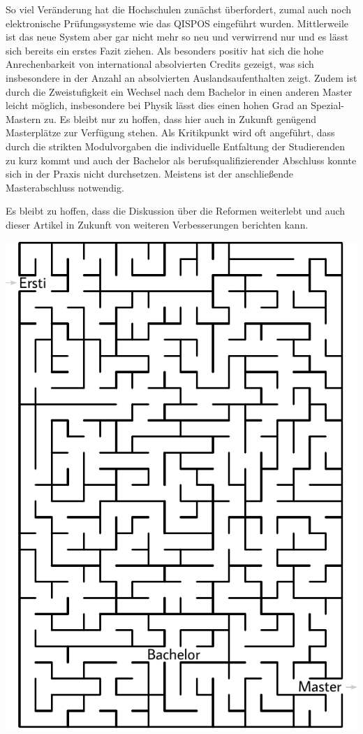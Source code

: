 \begin{multicols}{2}
So viel Veränderung hat die Hochschulen zunächst überfordert, zumal auch noch elektronische Prüfungssysteme wie das QISPOS eingeführt wurden. Mittlerweile ist das neue System aber gar nicht mehr so neu und verwirrend nur und es lässt sich bereits ein erstes Fazit ziehen.
Als besonders positiv hat sich die hohe Anrechenbarkeit von international absolvierten Credits gezeigt, was sich insbesondere in der Anzahl an absolvierten Auslandsaufenthalten zeigt. Zudem ist durch die Zweistufigkeit ein Wechsel nach dem Bachelor in einen anderen Master leicht möglich, insbesondere bei Physik lässt dies einen hohen Grad an Spezial-Mastern zu.
Es bleibt nur zu hoffen, dass hier auch in Zukunft genügend Masterplätze zur Verfügung stehen.
Als Kritikpunkt wird oft angeführt, dass durch die strikten Modulvorgaben die individuelle Entfaltung der Studierenden zu kurz kommt und auch der Bachelor als berufsqualifizierender Abschluss konnte sich in der Praxis nicht durchsetzen. Meistens ist der anschließende Masterabschluss notwendig.

Es bleibt zu hoffen, dass die Diskussion über die Reformen weiterlebt und auch dieser Artikel in Zukunft von weiteren Verbesserungen berichten kann.

\end{multicols}

\begin{center}
	\includegraphics[width=\textwidth, height=0.38\textheight]{res/bachelor_master_labyrinth.pdf}
\end{center}
